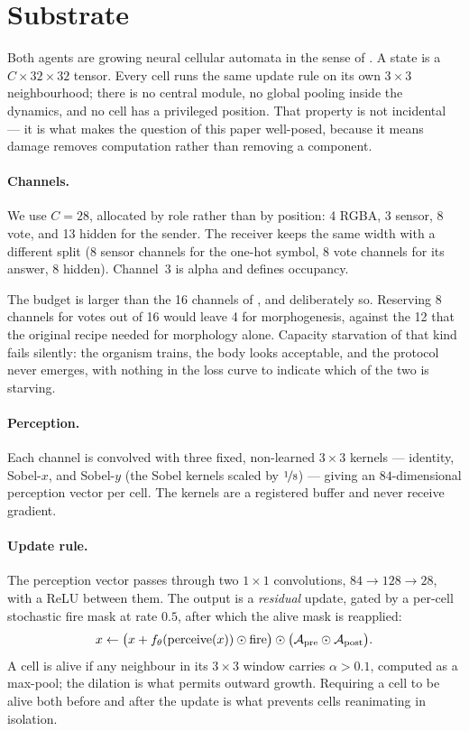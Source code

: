 \section{Substrate}
\label{sec:substrate}

Both agents are growing neural cellular automata in the sense of
\citet{mordvintsev2020growing}. A state is a $C \times 32 \times 32$ tensor. Every
cell runs the same update rule on its own $3\times3$ neighbourhood; there is no
central module, no global pooling inside the dynamics, and no cell has a
privileged position. That property is not incidental --- it is what makes the
question of this paper well-posed, because it means damage removes computation
rather than removing a component.

\paragraph{Channels.} We use $C=28$, allocated by role rather than by position:
4 RGBA, 3 sensor, 8 vote, and 13 hidden for the sender. The receiver keeps the
same width with a different split (8 sensor channels for the one-hot symbol, 8
vote channels for its answer, 8 hidden). Channel~3 is alpha and defines
occupancy.

The budget is larger than the 16 channels of \citet{mordvintsev2020growing}, and
deliberately so. Reserving 8 channels for votes out of 16 would leave 4 for
morphogenesis, against the 12 that the original recipe needed for morphology
alone. Capacity starvation of that kind fails silently: the organism trains, the
body looks acceptable, and the protocol never emerges, with nothing in the loss
curve to indicate which of the two is starving.

\paragraph{Perception.} Each channel is convolved with three fixed, non-learned
$3\times3$ kernels --- identity, Sobel-$x$, and Sobel-$y$ (the Sobel kernels
scaled by $\nicefrac{1}{8}$) --- giving an $84$-dimensional perception vector per
cell. The kernels are a registered buffer and never receive gradient.

\paragraph{Update rule.} The perception vector passes through two $1\times1$
convolutions, $84 \to 128 \to 28$, with a ReLU between them. The output is a
\emph{residual} update, gated by a per-cell stochastic fire mask at rate $0.5$,
after which the alive mask is reapplied:
%
\begin{equation}
  x \leftarrow \big(x + f_{\theta}(\mathrm{perceive}(x)) \odot \mathrm{fire}\big)
  \odot \big(\mathcal{A}_{\mathrm{pre}} \odot \mathcal{A}_{\mathrm{post}}\big).
\end{equation}
%
A cell is alive if any neighbour in its $3\times3$ window carries
$\alpha > 0.1$, computed as a max-pool; the dilation is what permits outward
growth. Requiring a cell to be alive both before and after the update is what
prevents cells reanimating in isolation.

